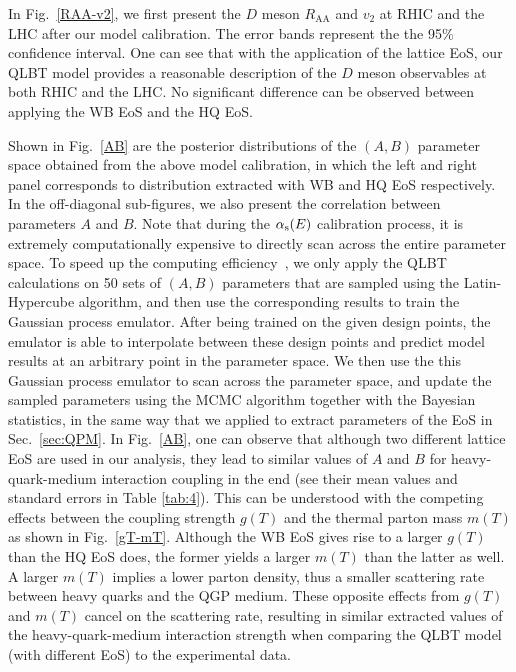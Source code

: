 \documentclass[aps,superscriptaddress,prc,twocolumn,nofootinbib]{revtex4}
\begin{document}
In Fig.~\ref{RAA-v2}, we first present the $D$ meson $R_\mathrm{AA}$ and $v_2$ at RHIC and the LHC after our model calibration. The error bands represent the the 95\% confidence interval. One can see that with the application of the lattice EoS, our QLBT model provides a reasonable description of the $D$ meson observables at both RHIC and the LHC. No significant difference can be observed between applying the WB EoS and the HQ EoS.

Shown in Fig.~\ref{AB} are the posterior distributions of the $(A, B)$ parameter space obtained from the above model calibration, in which the left and right panel corresponds to distribution extracted with WB and HQ EoS respectively. In the off-diagonal sub-figures, we also present the correlation between parameters $A$ and $B$.
Note that during the $\alpha_{\rm s}(E)$ calibration process, it is extremely computationally expensive to directly scan across the entire parameter space.
To speed up the computing efficiency~\cite{He:2018gks,Cao:2021keo}, we only apply the QLBT calculations on 50 sets of $(A, B)$ parameters that are sampled using the Latin-Hypercube algorithm, and then use the corresponding results to train the Gaussian process emulator. After being trained on the given design points, the emulator is able to interpolate between these design points and predict model results at an arbitrary point in the parameter space.
We then use the this Gaussian process emulator to scan across the parameter space, and update the sampled parameters using the MCMC algorithm together with the Bayesian statistics, in the same way that we applied to extract parameters of the EoS in Sec.~\ref{sec:QPM}.
In Fig.~\ref{AB}, one can observe that although two different lattice EoS are used in our analysis, they lead to similar values of $A$ and $B$ for heavy-quark-medium interaction coupling in the end (see their mean values and standard errors in Table \ref{tab:4}). This can be understood with the competing effects between the coupling strength $g(T)$ and the thermal parton mass $m(T)$ as shown in Fig.~\ref{gT-mT}. Although the WB EoS gives rise to a larger $g(T)$ than the HQ EoS does, the former yields a larger $m(T)$ than the latter as well. A larger $m(T)$ implies a lower parton density, thus a smaller scattering rate between heavy quarks and the QGP medium. These opposite effects from $g(T)$ and $m(T)$ cancel on the scattering rate, resulting in similar extracted values of the heavy-quark-medium interaction strength when comparing the QLBT model (with different EoS) to the experimental data.
\end{document}
